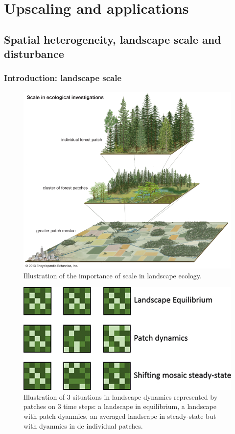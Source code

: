 \documentclass[12pt,oneside]{book}
\begin{document}
\part{Upscaling and
applications}\label{part-upscaling-and-applications}

\chapter{Spatial heterogeneity, landscape scale and
disturbance}\label{spatial-heterogeneity-landscape-scale-and-disturbance}


\section{Introduction: landscape
scale}\label{introduction-landscape-scale}

\begin{figure}

{\centering \includegraphics[width=0.8\linewidth]{figures/chap8/f81_landscape} 

}

\caption{Illustration of the importance of scale in landscape ecology.}\label{fig:f81}
\end{figure}

\begin{figure}

{\centering \includegraphics[width=0.8\linewidth]{figures/chap8/f82_patch} 

}

\caption{Illustration of 3 situations in landscape dynamics represented by patches on 3 time steps: a landscape in equilibrium, a landscape with patch dyanmics, an averaged landscape in steady-state but with dyanmics in de individual patches.}\label{fig:f82}
\end{figure}
\end{document}

